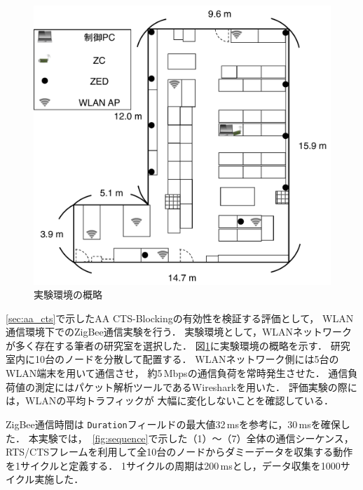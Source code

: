 \documentclass[technicalreport]{ieicej}
\begin{document}
\begin{figure}[bt]
 \centering
 \includegraphics[width=\columnwidth]{figure/fukuda_lab.pdf}
 \caption{実験環境の概略}
 \label{fig:fukuda_lab}
\end{figure}

\ref{sec:aa_cts}で示したAA CTS-Blockingの有効性を検証する評価として，
WLAN通信環境下でのZigBee通信実験を行う．
実験環境として，WLANネットワークが多く存在する筆者の研究室を選択した．
図\ref{fig:fukuda_lab}に実験環境の概略を示す．
研究室内に10台のノードを分散して配置する．
WLANネットワーク側には5台のWLAN端末を用いて通信させ，
約5\,Mbpsの通信負荷を常時発生させた．
通信負荷値の測定にはパケット解析ツールであるWiresharkを用いた．
評価実験の際には，WLANの平均トラフィックが
大幅に変化しないことを確認している．

ZigBee通信時間は
\texttt{Duration}フィールドの最大値32\,msを参考に，30\,msを確保した．
本実験では，\figurename~\ref{fig:sequence}で示した（1）〜（7）全体の通信シーケンス，
RTS/CTSフレームを利用して全10台のノードからダミーデータを収集する動作を1サイクルと定義する．
1サイクルの周期は200\,msとし，データ収集を1000サイクル実施した．%
\end{document}
